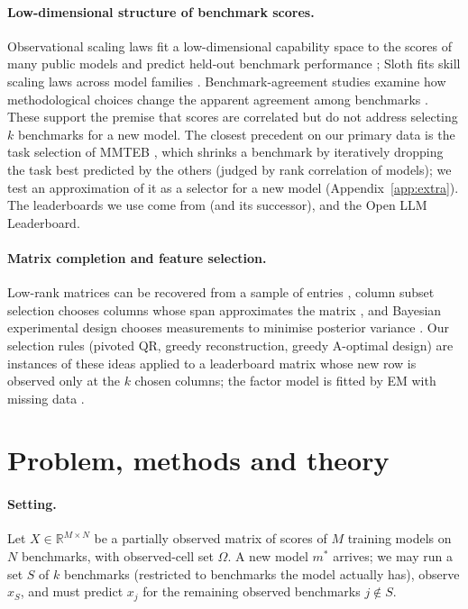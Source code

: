 \documentclass{article}
\begin{document}
\paragraph{Low-dimensional structure of benchmark scores.} Observational scaling laws fit a low-dimensional capability space to the scores of many public models and predict held-out benchmark performance \citep{ruan2024observational}; Sloth fits skill scaling laws across model families \citep{polo2024sloth}. Benchmark-agreement studies examine how methodological choices change the apparent agreement among benchmarks \citep{perlitz2024benchbench}. These support the premise that scores are correlated but do not address selecting $k$ benchmarks for a new model. The closest precedent on our primary data is the task selection of MMTEB \citep{enevoldsen2025mmteb}, which shrinks a benchmark by iteratively dropping the task best predicted by the others (judged by rank correlation of models); we test an approximation of it as a selector for a new model (Appendix~\ref{app:extra}). The leaderboards we use come from \citet{muennighoff2022mteb} (and its successor), \citet{liang2022helm} and the Open LLM Leaderboard.

\paragraph{Matrix completion and feature selection.} Low-rank matrices can be recovered from a sample of entries \citep{candes2009exact}, column subset selection chooses columns whose span approximates the matrix \citep{wang2015css}, and Bayesian experimental design chooses measurements to minimise posterior variance \citep{chaloner1995design}. Our selection rules (pivoted QR, greedy reconstruction, greedy A-optimal design) are instances of these ideas applied to a leaderboard matrix whose new row is observed only at the $k$ chosen columns; the factor model is fitted by EM with missing data \citep{rubin1982em}.

\section{Problem, methods and theory}
\label{sec:method}
\paragraph{Setting.}
Let $X\in\mathbb{R}^{M\times N}$ be a partially observed matrix of scores of $M$ training models on $N$ benchmarks, with observed-cell set $\Omega$. A new model $m^\ast$ arrives; we may run a set $S$ of $k$ benchmarks (restricted to benchmarks the model actually has), observe $x_S$, and must predict $x_j$ for the remaining observed benchmarks $j\notin S$.
\end{document}
